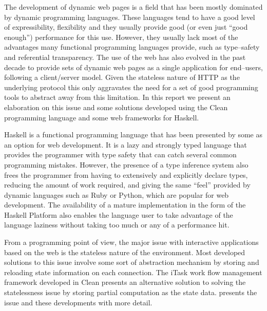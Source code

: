 The development of dynamic web pages is a field that has been mostly dominated by dynamic programming languages. %
These languages tend to have a good level of expressibility, flexibility and they usually provide good (or even just ``good enough'') performance for this use.
However, they usually lack most of the advantages many functional programming languages provide, such as type--safety and referential transparency.
The use of the web has also evolved in the past decade to provide sets of dynamic web pages as a single application for end--users, following a client/server model.
Given the stateless nature of HTTP as the underlying protocol this only aggravates the need for a set of good programming tools to abstract away from this limitation.
In this report we present an elaboration on this issue and some solutions developed using the Clean programming language and some web frameworks for Haskell.

Haskell is a functional programming language that has been presented by some as an option for web development. \cite{snap,warp}
It is a lazy and strongly typed language that provides the programmer with type safety that can catch several common programming mistakes.
However, the presence of a type inference system also frees the programmer from having to extensively and explicitly declare types, reducing the amount of work required, and giving the same ``feel'' provided by dynamic languages such as Ruby or Python, which are popular for web development.
The availability of a mature implementation in the form of the Haskell Platform also enables the language user to take advantage of the language laziness without taking too much or any of a performance hit.

From a programming point of view, the major issue with interactive applications based on the web is the stateless nature of the environment.
Most developed solutions to this issue involve some sort of abstraction mechanism by storing and reloading state information on each connection.
The iTask work flow management framework developed in Clean presents an alternative solution to solving the statelessness issue by storing partial computation as the state data.
 presents the issue and these developments with more detail.

